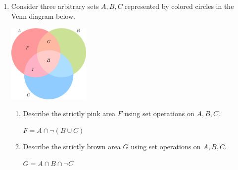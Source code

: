 \documentclass[11pt]{article}
\begin{document}
\begin{enumerate}
		\item Consider three arbitrary sets $ A, B, C $ represented by colored circles in the Venn diagram below.
			\begin{mdframed}[default, userdefinedwidth=4.8cm]
				\includegraphics[width=4cm]{venn_pic.pdf}
			\end{mdframed}
			\begin{enumerate}
				\item Describe the strictly pink area $ F $ using set operations on $ A, B, C $.
					\begin{mdframed}
						$ F = A \cap \neg (B \cup C) $
					\end{mdframed}
				\item Describe the strictly brown area $ G $ using set operations on $ A, B, C $.
					\begin{mdframed}
						$ G = A \cap B \cap \neg C $
					\end{mdframed}
			\end{enumerate}
	\end{enumerate}
\end{document}
